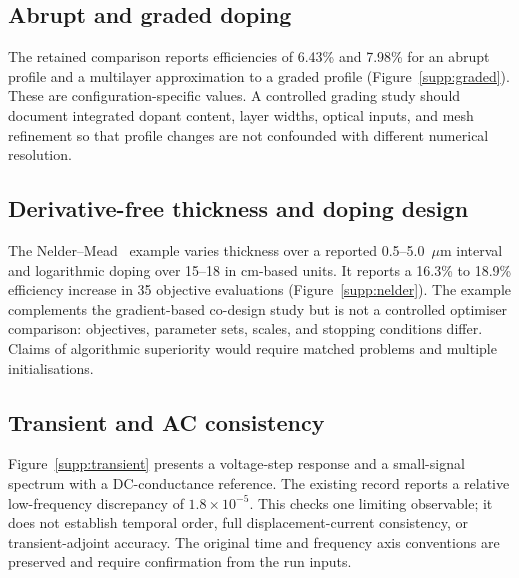 \documentclass[11pt,a4paper]{article}
\numberwithin{equation}{section}
\begin{document}
\subsection{Abrupt and graded doping}
The retained comparison reports efficiencies of 6.43\% and 7.98\% for an
abrupt profile and a multilayer approximation to a graded profile
(Figure~\ref{supp:graded}). These are configuration-specific values.
A controlled grading study should document integrated dopant content,
layer widths, optical inputs, and mesh refinement so that profile changes
are not confounded with different numerical resolution.

\subsection{Derivative-free thickness and doping design}
The Nelder--Mead~\cite{nelder1965} example varies thickness over a reported
0.5--5.0~$\mu$m interval and logarithmic doping over 15--18 in cm-based
units. It reports a 16.3\% to 18.9\% efficiency increase in 35 objective
evaluations (Figure~\ref{supp:nelder}). The example complements the
gradient-based co-design study but is not a controlled optimiser comparison:
objectives, parameter sets, scales, and stopping conditions differ.
Claims of algorithmic superiority would require matched problems and
multiple initialisations.

\subsection{Transient and AC consistency}
Figure~\ref{supp:transient} presents a voltage-step response and a
small-signal spectrum with a DC-conductance reference. The existing record
reports a relative low-frequency discrepancy of $1.8\times10^{-5}$.
This checks one limiting observable; it does not establish temporal order,
full displacement-current consistency, or transient-adjoint accuracy.
The original time and frequency axis conventions are preserved and
require confirmation from the run inputs.
\end{document}
